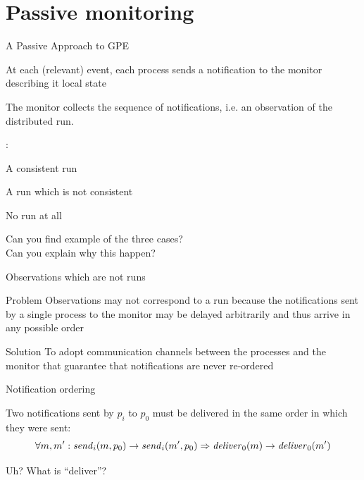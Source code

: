 \section{Passive monitoring}

\begin{frame}{A Passive Approach to GPE}

\BI
\item At each (relevant) event, each process sends a \alert{notification} to the 
  monitor describing it local state
\item The monitor collects the sequence of \alert{notifications}, i.e. an observation of the distributed run.
\EI

\bigskip
{}:
\BI
\item A consistent run
\item A run which is not consistent
\item No run at all
\EI

\bigskip
Can you find example of the three cases?\\
Can you explain why this happen?
\end{frame}


\begin{frame}{Observations which are not runs}

\begin{block}{Problem} 
Observations may not correspond to a run because the notifications sent
by a single process to the monitor may be delayed arbitrarily and thus 
arrive in any possible order
\end{block}

\pause
\bigskip
\begin{block}{Solution}
To adopt communication channels between the processes and the monitor that 
guarantee that notifications are never re-ordered
\end{block}

\end{frame}

\begin{frame}{Notification ordering}
\begin{definition}
Two notifications sent by $p_i$ to $p_0$ must be delivered in the
same order in which they were sent:
\[
\forall m,m': \mathit{send}_i(m,p_0) \rightarrow \mathit{send}_i(m',p_0) \Rightarrow \mathit{deliver}_0(m) \rightarrow \mathit{deliver}_0(m')
\]
\end{definition}

\bigskip
Uh? What is ``deliver''?

\end{frame}

